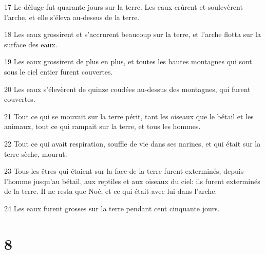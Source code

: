 \par 17 Le déluge fut quarante jours sur la terre. Les eaux crûrent et soulevèrent l'arche, et elle s'éleva au-dessus de la terre.
\par 18 Les eaux grossirent et s'accrurent beaucoup sur la terre, et l'arche flotta sur la surface des eaux.
\par 19 Les eaux grossirent de plus en plus, et toutes les hautes montagnes qui sont sous le ciel entier furent couvertes.
\par 20 Les eaux s'élevèrent de quinze coudées au-dessus des montagnes, qui furent couvertes.
\par 21 Tout ce qui se mouvait sur la terre périt, tant les oiseaux que le bétail et les animaux, tout ce qui rampait sur la terre, et tous les hommes.
\par 22 Tout ce qui avait respiration, souffle de vie dans ses narines, et qui était sur la terre sèche, mourut.
\par 23 Tous les êtres qui étaient sur la face de la terre furent exterminés, depuis l'homme jusqu'au bétail, aux reptiles et aux oiseaux du ciel: ils furent exterminés de la terre. Il ne resta que Noé, et ce qui était avec lui dans l'arche.
\par 24 Les eaux furent grosses sur la terre pendant cent cinquante jours.

\chapter{8}


